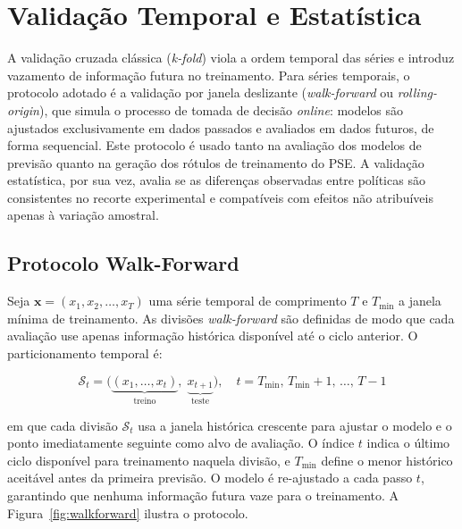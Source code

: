 \section{Validação Temporal e Estatística}
\label{sec:wf_protocol}

A validação cruzada clássica (\textit{k-fold}) viola a ordem temporal das séries e introduz vazamento de informação futura no treinamento. Para séries temporais, o protocolo adotado é a validação por janela deslizante (\textit{walk-forward} ou \textit{rolling-origin}), que simula o processo de tomada de decisão \textit{online}: modelos são ajustados exclusivamente em dados passados e avaliados em dados futuros, de forma sequencial. Este protocolo é usado tanto na avaliação dos modelos de previsão quanto na geração dos rótulos de treinamento do PSE. A validação estatística, por sua vez, avalia se as diferenças observadas entre políticas são consistentes no recorte experimental e compatíveis com efeitos não atribuíveis apenas à variação amostral.

\subsection{Protocolo Walk-Forward}

Seja $\mathbf{x} = (x_1, x_2, \ldots, x_T)$ uma série temporal de comprimento $T$ e $T_{\min}$ a janela mínima de treinamento. As divisões \textit{walk-forward} são definidas de modo que cada avaliação use apenas informação histórica disponível até o ciclo anterior. O particionamento temporal é:

\begin{equation}
\label{eq:wf_splits}
\mathcal{S}_t = \bigl(\underbrace{(x_1,\ldots,x_t)}_{\text{treino}},\; \underbrace{x_{t+1}}_{\text{teste}}\bigr), \quad t = T_{\min},\, T_{\min}+1,\, \ldots,\, T-1
\end{equation}

\noindent em que cada divisão $\mathcal{S}_t$ usa a janela histórica crescente para ajustar o modelo e o ponto imediatamente seguinte como alvo de avaliação. O índice $t$ indica o último ciclo disponível para treinamento naquela divisão, e $T_{\min}$ define o menor histórico aceitável antes da primeira previsão. O modelo é re-ajustado a cada passo $t$, garantindo que nenhuma informação futura vaze para o treinamento. A Figura~\ref{fig:walkforward} ilustra o protocolo.


